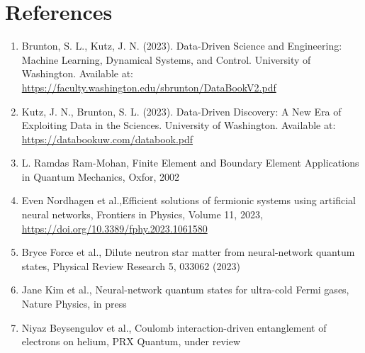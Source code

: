 \documentclass{article}
\begin{document}
\section{References}
\begin{enumerate}
    \item Brunton, S. L., Kutz, J. N. (2023). Data-Driven Science and Engineering: Machine Learning, Dynamical Systems, and Control. University of Washington. Available at: \url{https://faculty.washington.edu/sbrunton/DataBookV2.pdf}
    \item Kutz, J. N., Brunton, S. L. (2023). Data-Driven Discovery: A New Era of Exploiting Data in the Sciences. University of Washington. Available at: \url{https://databookuw.com/databook.pdf}
    \item L. Ramdas Ram-Mohan, Finite Element and Boundary Element Applications in Quantum Mechanics, Oxfor, 2002
    \item Even Nordhagen et al.,Efficient solutions of fermionic systems using artificial neural networks, Frontiers in Physics, Volume 11, 2023, \url{https://doi.org/10.3389/fphy.2023.1061580}
    \item Bryce Force et al.,  Dilute neutron star matter from neural-network quantum states, Physical Review Research 5, 033062 (2023)
    \item Jane Kim et al., Neural-network quantum states for ultra-cold Fermi gases, Nature Physics, in press
    \item Niyaz Beysengulov et al., Coulomb interaction-driven entanglement of electrons on helium, PRX Quantum, under review
\end{enumerate}
\end{document}
